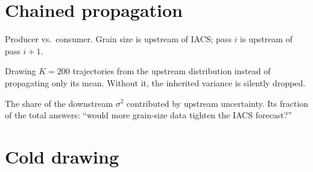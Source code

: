 \documentclass[11pt,a4paper]{article}
\newcommand{\code}[1]{\texttt{\small #1}}
\newenvironment{terms}
  {\begin{description}[style=unboxed,leftmargin=1.2em,itemsep=0.45em,parsep=0pt,
                       font=\normalfont\bfseries]}
  {\end{description}}
\begin{document}
\section{Chained propagation}

\begin{terms}
  \item[Upstream / downstream] Producer vs.\ consumer. Grain size is upstream
    of IACS; pass $i$ is upstream of pass $i+1$.

  \item[MC (Monte Carlo) / $K$] Drawing $K = 200$ trajectories from the
    upstream distribution instead of propagating only its mean. Without it,
    the inherited variance is silently dropped.

  \item[\code{sigma2\_propagated}] The share of the downstream $\sigma^2$
    contributed by upstream uncertainty. Its fraction of the total answers:
    ``would more grain-size data tighten the IACS forecast?''
\end{terms}

\section{Cold drawing}
\end{document}
